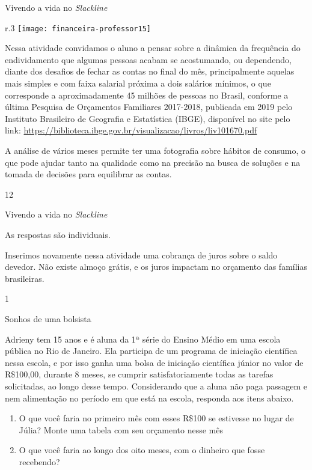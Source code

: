 \clearmargin
\begin{sugestions}{Vivendo a vida no \textit{Slackline}}
{
\begin{wrapfigure}{r}{.3\linewidth}
\vspace{-1em}
\texttt{[image: financeira-professor15]}
\end{wrapfigure}
Nessa atividade convidamos o aluno a pensar sobre a dinâmica da frequência do endividamento que algumas pessoas acabam se acostumando, ou dependendo, diante dos desafios de fechar as contas no final do mês, principalmente aquelas mais simples e com faixa salarial próxima a dois salários mínimos, o que corresponde a aproximadamente 45 milhões de pessoas no Brasil, conforme a última Pesquisa de Orçamentos Familiares 2017-2018, publicada em 2019 pelo Instituto Brasileiro de Geografia e Estatística (IBGE), disponível no site pelo link: \url{https://biblioteca.ibge.gov.br/visualizacao/livros/liv101670.pdf}

A análise de vários meses permite ter uma fotografia sobre hábitos de consumo, o que pode ajudar tanto na qualidade como na precisão na busca de soluções e na tomada de decisões para equilibrar as contas.
}{1}{2}
\end{sugestions}
\marginpar{\vspace{.5em}}


\begin{answer}{Vivendo a vida no \textit{Slackline}}
{
  As respostas são individuais. 

  Inserimos novamente nessa atividade uma cobrança de juros sobre o saldo devedor. Não existe almoço grátis, e os juros impactam no orçamento das famílias brasileiras.
}{1}
\end{answer}

\label{fin-prac-2}

\begin{task}{Sonhos de uma bolsista}
\label{fin-ativ-10}

Adrieny tem 15 anos e é aluna da 1ª série do Ensino Médio em uma escola pública no Rio de Janeiro. Ela participa de um programa de iniciação científica nessa escola, e por isso ganha uma bolsa de iniciação científica júnior no valor de R\$100{,}00, durante 8 meses, se cumprir satisfatoriamente todas as tarefas solicitadas, ao longo desse tempo. Considerando que a aluna não paga passagem e nem alimentação no período em que está na escola, responda aos itens abaixo.

\begin{enumerate}
\item O que você faria no primeiro mês com esses R\$100 se estivesse no lugar de Júlia? Monte uma tabela com seu orçamento nesse mês
\item O que você faria ao longo dos oito meses, com o dinheiro que fosse recebendo?
\end{enumerate}
\end{task}

